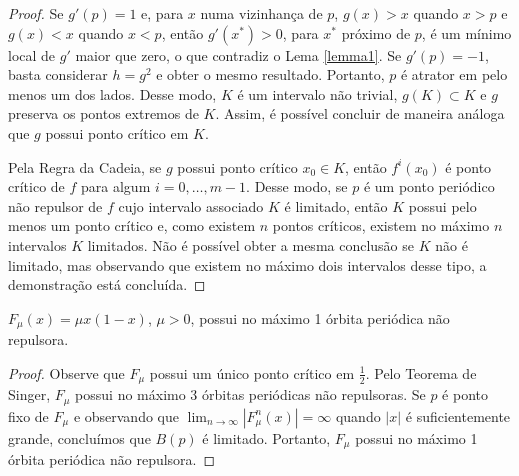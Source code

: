 \begin{proof}
Se $g'(p) = 1$ e, para $x$ numa vizinhança de $p$, $g(x) > x$ quando $x > p$ e $g(x) < x$ quando $x < p$, então $g'(x^*) > 0$, para $x^*$ próximo de $p$, é um mínimo local de $g'$ maior que zero, o que contradiz o Lema \ref{lemma1}. Se $g'(p)=-1$, basta considerar $h=g^2$ e obter o mesmo resultado. Portanto, $p$ é atrator em pelo menos um dos lados. Desse modo, $K$ é um intervalo não trivial, $g(K) \subset K$ e $g$ preserva os pontos extremos de $K$. Assim, é possível concluir de maneira análoga que $g$ possui ponto crítico em $K$.

Pela Regra da Cadeia, se $g$ possui ponto crítico $x_0 \in K$, então $f^i(x_0)$ é ponto crítico de $f$ para algum $i = 0, \dots, m-1$. Desse modo, se $p$ é um ponto periódico não repulsor de $f$ cujo intervalo associado $K$ é limitado, então $K$ possui pelo menos um ponto crítico e, como existem $n$ pontos críticos, existem no máximo $n$ intervalos $K$ limitados. Não é possível obter a mesma conclusão se $K$ não é limitado, mas observando que existem no máximo dois intervalos desse tipo, a demonstração está concluída.
\end{proof}

\begin{corollary}
$F_\mu(x) = \mu x(1-x)$, $\mu > 0$, possui no máximo 1 órbita periódica não repulsora.
\end{corollary}

\begin{proof}
Observe que $F_\mu$ possui um único ponto crítico em $\frac{1}{2}$. Pelo Teorema de Singer, $F_\mu$ possui no máximo 3 órbitas periódicas não repulsoras. Se $p$ é ponto fixo de $F_\mu$ e observando que $\lim_{n \to\infty} |F^n_\mu(x)| = \infty$ quando $|x|$ é suficientemente grande, concluímos que $B(p)$ é limitado. Portanto, $F_\mu$ possui no máximo 1 órbita periódica não repulsora.
\end{proof}

